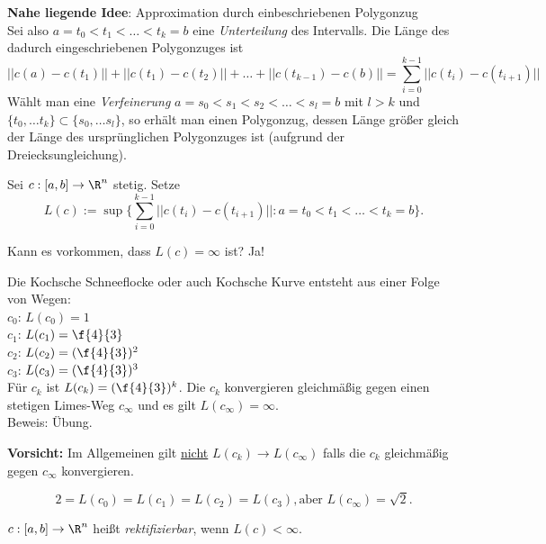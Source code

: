 \documentclass{mycourse}
\begin{document}
\textbf{Nahe liegende Idee}: Approximation durch einbeschriebenen Polygonzug \\
Sei also $ a = t_0 < t_1 < \dots < t_k = b$ eine \emph{Unterteilung} des Intervalls. Die Länge des dadurch eingeschriebenen Polygonzuges ist 
\[
	||c(a) - c(t_1)|| + ||c(t_1) - c(t_2)|| + \dots + ||c(t_{k-1}) - c(b)|| = \sum_{i=0}^{k-1} ||c(t_i) - c(t_{i+1})||
\]
Wählt man eine \emph{Verfeinerung} $ a = s_0 < s_1 < s_2 < \dots < s_l = b$ mit $l > k$ und $\{t_0, \dots t_k\} \subset \{s_0, \dots s_l\}$, so erhält man einen Polygonzug, dessen Länge größer gleich der Länge des ursprünglichen Polygonzuges ist (aufgrund der Dreiecksungleichung). 

\begin{df}
Sei $c: [a,b] \to \R^n$ stetig. Setze 
\[
     L(c) := \sup \Big\{ \sum_{i=0}^{k-1} ||c(t_i) - c(t_{i+1})|| : a = t_0 < t_1 < \dots < t_k = b \Big\}.
\]
\end{df}

Kann es vorkommen, dass $L(c) = \infty$ ist? Ja! 

\begin{ex}
Die Kochsche Schneeflocke oder auch Kochsche Kurve entsteht aus einer Folge von Wegen: \\
$c_0$: $L(c_0) = 1$  \\
$c_1$: $L(c_1) = \f{4}{3}$  \\
$c_2$: $L(c_2) = (\f{4}{3})^2$  \\
$c_3$: $L(c_3) = (\f{4}{3})^3$  \\

Für $c_k$ ist $L(c_k) = (\f{4}{3})^k$. Die $c_k$ konvergieren gleichmäßig gegen einen stetigen Limes-Weg $c_{\infty}$ und es gilt $L(c_{\infty}) = \infty$. \\
Beweis: Übung. \\
\fixme[Bilder]
\end{ex}

\begin{note}
\textbf{Vorsicht:} Im Allgemeinen gilt \underline{nicht} $L(c_k) \to L(c_{\infty})$ falls die $c_k$ gleichmäßig gegen $c_{\infty}$ konvergieren.
\begin{ex*}
\[ 2 = L(c_0) = L(c_1) = L(c_2) = L(c_3), \text{aber } L(c_{\infty}) = \sqrt{2}. \]
\end{ex*}
\fixme[Bilder]
\end{note}

\begin{df}
$c: [a,b] \to \R^n$ heißt \emph{rektifizierbar}, wenn $L(c) < \infty$.
\end{df}
\end{document}
